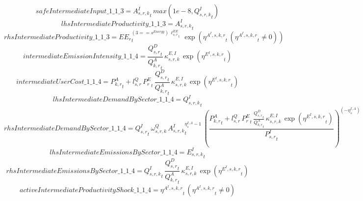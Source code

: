 \begin{dmath*}
safeIntermediateInput\_1\_1\_3 = {{A^{I}_{s,r,k}}}_{t}\, max(1e-8,{{Q^{I}_{s,r,k}}}_{t})
\end{dmath*}
\begin{dmath*}
lhsIntermediateProductivity\_1\_1\_3 = {{A^{I}_{s,r,k}}}_{t}
\end{dmath*}
\begin{dmath*}
rhsIntermediateProductivity\_1\_1\_3 = {{EE_r}}_{t}^{\left(3=={{s^{Energy}}}\right)\, {{\ell^{EE}_{s,r}}}_{t}}\, \exp\left({{\eta^{A^{I},s,k,r}}}_{t}\, \left({{\eta^{A^{I},s,k,r}}}_{t}\neq 0\right)\right)
\end{dmath*}
\begin{dmath*}
intermediateEmissionIntensity\_1\_1\_4 = \frac{{{Q^{D}_{s,r}}}_{t}}{{{Q^{A}_{k,r}}}_{t}}\, {{\kappa^{E,I}_{s,r,k}}}\, \exp\left({{\eta^{E^{I},s,k,r}}}_{t}\right)
\end{dmath*}
\begin{dmath*}
intermediateUserCost\_1\_1\_4 = {{P^{A}_{k,r}}}_{t}+{{l^{Q}_{s,r}}}\, {{P^E_r}}_{t}\, \frac{{{Q^{D}_{s,r}}}_{t}}{{{Q^{A}_{k,r}}}_{t}}\, {{\kappa^{E,I}_{s,r,k}}}\, \exp\left({{\eta^{E^{I},s,k,r}}}_{t}\right)
\end{dmath*}
\begin{dmath*}
lhsIntermediateDemandBySector\_1\_1\_4 = {{Q^{I}_{s,r,k}}}_{t}
\end{dmath*}
\begin{dmath*}
rhsIntermediateDemandBySector\_1\_1\_4 = {{Q^{I}_{s,r}}}_{t}\, {{\omega^{Q}_{s,r,k}}}\, {{A^{I}_{s,r,k}}}_{t}^{{{\eta^{I,A}_{s}}}-1}\, \left(\frac{{{P^{A}_{k,r}}}_{t}+{{l^{Q}_{s,r}}}\, {{P^E_r}}_{t}\, \frac{{{Q^{D}_{s,r}}}_{t}}{{{Q^{A}_{k,r}}}_{t}}\, {{\kappa^{E,I}_{s,r,k}}}\, \exp\left({{\eta^{E^{I},s,k,r}}}_{t}\right)}{{{P^{I}_{s,r}}}_{t}}\right)^{\left(-{{\eta^{I,A}_{s}}}\right)}
\end{dmath*}
\begin{dmath*}
lhsIntermediateEmissionsBySector\_1\_1\_4 = {{E^I_{s,r,k}}}_{t}
\end{dmath*}
\begin{dmath*}
rhsIntermediateEmissionsBySector\_1\_1\_4 = {{Q^{I}_{s,r,k}}}_{t}\, \frac{{{Q^{D}_{s,r}}}_{t}}{{{Q^{A}_{k,r}}}_{t}}\, {{\kappa^{E,I}_{s,r,k}}}\, \exp\left({{\eta^{E^{I},s,k,r}}}_{t}\right)
\end{dmath*}
\begin{dmath*}
activeIntermediateProductivityShock\_1\_1\_4 = {{\eta^{A^{I},s,k,r}}}_{t}\, \left({{\eta^{A^{I},s,k,r}}}_{t}\neq 0\right)
\end{dmath*}
